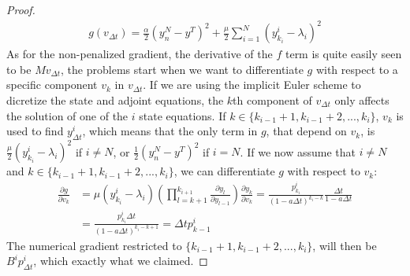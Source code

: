 \begin{proof}
\begin{align*}
g(v_{\Delta t}) = \frac{\alpha}{2}(y_n^N-y^T)^2+\frac{\mu }{2}\sum_{i=1}^{N} (y_{k_i}^{i}-\lambda_i)^2
\end{align*} 
As for the non-penalized gradient, the derivative of the $f$ term is quite easily seen to be $Mv_{\Delta t}$, the problems start when we want to differentiate $g$ with respect to a specific component $v_k$ in $v_{\Delta t}$. If we are using the implicit Euler scheme to dicretize the state and adjoint equations, the $k$th component of $v_{\Delta t}$ only affects the solution of one of the $i$ state equations. If $k\in \{k_{i-1}+1,k_{i-1}+2,...,k_{i}\}$, $v_k$ is used to find $y_{\Delta t}^i$, which means that the only term in $g$, that depend on $v_k$, is  $\frac{\mu }{2}(y_{k_i}^{i}-\lambda_i)^2$ if $i\neq N$, or $\frac{1}{2}(y_n^N-y^T)^2$ if $i=N$. If we now assume that $i\neq N$ and $k\in \{k_{i-1}+1,k_{i-1}+2,...,k_{i}\}$, we can differentiate $g$ with respect to $v_k$:
\begin{align*}
\frac{\partial g}{\partial v_k} &=\mu( y_{k_i}^{i}-\lambda_i) (\prod_{l=k+1}^{k_{i+1}}\frac{\partial y_{l}}{\partial y_{l-1}}) \frac{\partial y_k}{\partial v_{k}} = \frac{p_{k_i}^i}{(1-a\Delta t)^{k_{i}-k}}\frac{\Delta t}{1-a\Delta t} \\
&= \frac{p_{k_i}^i\Delta t}{(1-a\Delta t)^{k_i-k+1}}=\Delta t p_{k-1}^i
\end{align*}
The numerical gradient restricted to $ \{k_{i-1}+1,k_{i-1}+2,...,k_{i}\}$, will then be $B^ip_{\Delta t}^i$, which exactly what we claimed.
\end{proof}
